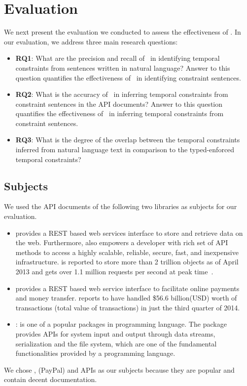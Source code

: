 \section{Evaluation}
\label{sec:evaluation}

We next present the evaluation we conducted to assess the effectiveness of \tool. In our evaluation, we address three main research questions:

\begin{itemize}
	\item\textbf{RQ1}: What are the precision and recall of \tool\ in identifying temporal constraints from sentences written in natural language?
	Answer to this question quantifies the effectiveness of \tool\ in identifying constraint sentences.
	\item\textbf{RQ2}: What is the accuracy of \tool\ in inferring temporal constraints from constraint sentences in the API documents?
	Answer to this question quantifies the effectiveness of \tool\ in inferring temporal constraints from constraint sentences. 
	\item\textbf{RQ3}: What is the degree of the overlap between the temporal constraints inferred from natural language text in comparison to the typed-enforced temporal constraints?
	
 
\end{itemize}

\subsection{Subjects}
\label{sub:subject}

We used the API documents of the following two libraries as subjects for our evaluation. 
\begin{itemize}
	\item \amazonAPI\: provides a REST based web services interface to store and retrieve data on the web.
	Furthermore,  also empowers a developer with rich set of API methods to access a highly scalable, reliable, secure, fast, and inexpensive infrastructure. 
	 is reported to store more than 2 trillion objects as of April 2013 and gets over 1.1 million requests per second at peak time~\cite{amazons3stats}.
	
	\item \paypalAPI\: provides a REST based web service interface to facilitate online payments and money transfer.
	 reports to have handled \$56.6 billion(USD) worth of transactions (total value of transactions) in just the third quarter of 2014. 
	
	\item{} : is one of a popular packages in  programming language. The package provides APIs for system input and output through data streams, serialization and the file system, which are one of the fundamental functionalities provided by a programming language.
\end{itemize}
We chose , \CodeIn(PayPal) and  APIs as our subjects because they are popular and contain decent documentation.

